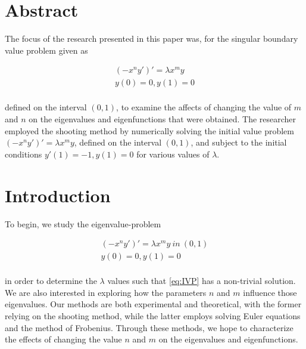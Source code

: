 \documentclass[executivepaper]{article}
\begin{document}
\begin{center}

\section*{Abstract}

The focus of the research presented in this paper was, for the singular boundary value problem given as 

\begin{center}

\vspace{-2mm}

\begin{equation}
\begin{array}{l}
\displaystyle (-x^ny')'=\lambda x^my\\[2ex]
\displaystyle y(0)=0, y(1)=0 \\
\end{array} 
\label{eq:BVP}
\end{equation}

\end{center}

defined on the interval $(0,1)$, to examine the affects of changing the value of $m$ and $n$ on the eigenvalues and eigenfunctions that were obtained. The researcher employed the shooting method by numerically solving the initial value problem $(-x^ny')'=\lambda x^my$, defined on the interval $(0,1)$, and subject to the initial conditions $y'(1)=-1, y(1)=0$ for various values of $\lambda$.

\vspace{5mm}

\section*{Introduction}

\end{center}

To begin, we study the eigenvalue-problem

\begin{equation}
\begin{array}{l}
\displaystyle (-x^ny')'=\lambda x^my {~} in {~} (0,1)\\[2ex]
\displaystyle y(0)=0, y(1)=0 \\
\end{array} 
\label{eq:IVP}
\end{equation}

in order to determine the $\lambda$ values such that \eqref{eq:IVP} has a non-trivial solution. We are also interested in exploring how the parameters $n$ and $m$ influence those eigenvalues. Our methods are both experimental and theoretical, with the former relying on the shooting method, while the latter employs solving Euler equations and the method of Frobenius. Through these methods, we hope to characterize the effects of changing the value $n$ and $m$ on the eigenvalues and eigenfunctions. 
\end{document}
